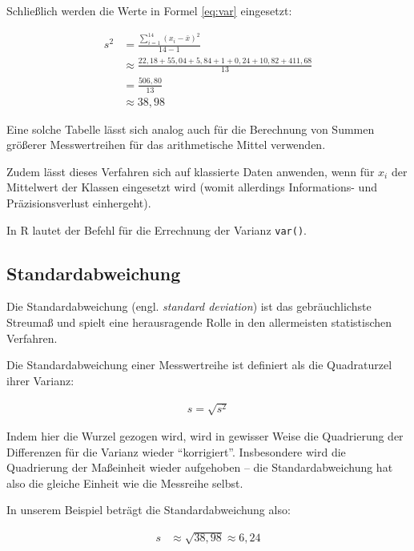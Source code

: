 \documentclass[
  11pt,
  ngerman,
  a4paper,
]{report}
\newenvironment{rtip}{
  \medskip
  \begin{tcolorbox}[colframe=purple,colback=light_gray,title=Softwarehinweis]
}{
  \end{tcolorbox}
  \medskip
}
\begin{document}
Schließlich werden die Werte in Formel \eqref{eq:var} eingesetzt:

\nopagebreak

\[\begin{aligned}
    s^2&=\frac{\sum\limits_{i=1}^{14}(x_{i}-\bar{x})^2}{14-1} \\[4pt]
       &\approx\frac{22{,}18+55{,}04+5{,}84+1+0{,}24+10{,}82+411{,}68}{13} \\[4pt]
       &=\frac{506{,}80}{13}\\[4pt]
       &\approx 38{,}98
\end{aligned}\]

Eine solche Tabelle lässt sich analog auch für die Berechnung von Summen größerer Messwertreihen für das arithmetische Mittel verwenden.

Zudem lässt dieses Verfahren sich auf klassierte Daten anwenden, wenn für \(x_i\) der Mittelwert der Klassen eingesetzt wird (womit allerdings Informations- und Präzisionsverlust einhergeht).

\begin{rtip}
In R lautet der Befehl für die Errechnung der Varianz \verb|var()|.
\end{rtip}

\hypertarget{standardabweichung}{%
\subsection{Standardabweichung}\label{standardabweichung}}

Die Standardabweichung (engl. \emph{standard deviation}) ist das gebräuchlichste Streumaß und spielt eine herausragende Rolle in den allermeisten statistischen Verfahren.

Die Standardabweichung einer Messwertreihe ist definiert als die Quadraturzel ihrer Varianz:

\[
  \begin{aligned}
    s=\sqrt{s^2}
  \end{aligned}
  \label{eq:sd}
\]

Indem hier die Wurzel gezogen wird, wird in gewisser Weise die Quadrierung der Differenzen für die Varianz wieder \enquote{korrigiert}. Insbesondere wird die Quadrierung der Maßeinheit wieder aufgehoben -- die Standardabweichung hat also die gleiche Einheit wie die Messreihe selbst.

In unserem Beispiel beträgt die Standardabweichung also:

\[
  \begin{aligned}
    s&\approx\sqrt{38{,}98}
      \approx6{,}24
  \end{aligned}
\]
\end{document}
